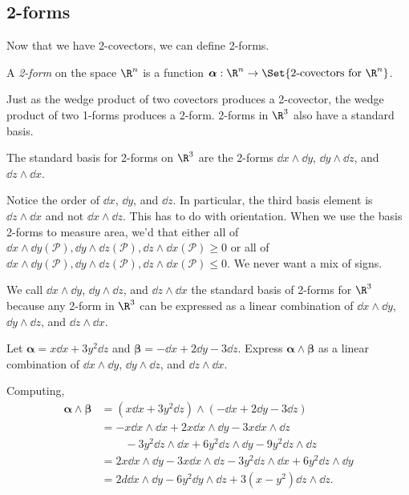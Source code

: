 \subsection{2-forms}

Now that we have 2-covectors, we can define 2-forms.

\begin{definition}[2-form]
	A \emph{2-form} on the space $\R^n$ is a function $\bm\alpha:
	\R^n\to \Set{\text{2-covectors for }\R^n}$.
\end{definition}

Just as the wedge product of
two covectors produces a 2-covector, the wedge
product of two 1-forms produces a 2-form.
2-forms in $\R^3$ also have a standard basis.

\begin{definition}
	The standard basis for 2-forms on $\R^3$ are the 2-forms
	$\dd x\wedge \dd y$, $\dd y\wedge \dd z$, and $\dd z \wedge \dd x$.
\end{definition}

Notice the order of $\dd x$, $\dd y$, and $\dd z$.  In particular, the third basis element
is $\dd z\wedge \dd x$ and not $\dd x\wedge \dd z$.  This has to do with 
orientation.  When we use the basis 2-forms to measure area, we'd that either all of
$\dd x\wedge \dd y(\mathcal P), \dd y\wedge \dd z(\mathcal P), \dd z\wedge \dd x(\mathcal P)\geq 0$
or all of
$\dd x\wedge \dd y(\mathcal P), \dd y\wedge \dd z(\mathcal P), \dd z\wedge \dd x(\mathcal P)\leq 0$.
We never want a mix of signs.

We call $\dd x\wedge \dd y$, $\dd y\wedge \dd z$, and $\dd z \wedge \dd x$
the standard basis of 2-forms for $\R^3$ because any 2-form in $\R^3$ can
be expressed as a linear combination of 
$\dd x\wedge \dd y$, $\dd y\wedge \dd z$, and $\dd z \wedge \dd x$.

\begin{example}
	Let $\bm \alpha = x\dd x+3y^2\dd z$ and $\bm\beta = -\dd x+2\dd y -3\dd z$.
	Express $\bm \alpha \wedge \bm \beta$ as a linear combination of
	$\dd x\wedge \dd y$, $\dd y\wedge \dd z$, and $\dd z \wedge \dd x$.

	Computing,
	\begin{align*}
		\bm\alpha\wedge\bm\beta &= (x\dd x+3y^2\dd z)\wedge(-\dd x+2\dd y -3\dd z) \\
		&= -x\dd x\wedge \dd x + 2x\dd x\wedge \dd y -3x \dd x\wedge \dd z \\
		&\phantom{=-}-3y^2\dd z\wedge \dd x
			+6y^2\dd z\wedge \dd y -9y^2\dd z\wedge \dd z \\
		&=2x\dd x\wedge \dd y -3x \dd x\wedge \dd z -3y^2\dd z\wedge \dd x
			+6y^2\dd z\wedge \dd y\\
		&= 2d\dd x\wedge\dd y -6y^2\dd y\wedge \dd z + 3(x-y^2)\dd z\wedge \dd z.
	\end{align*}
\end{example}

